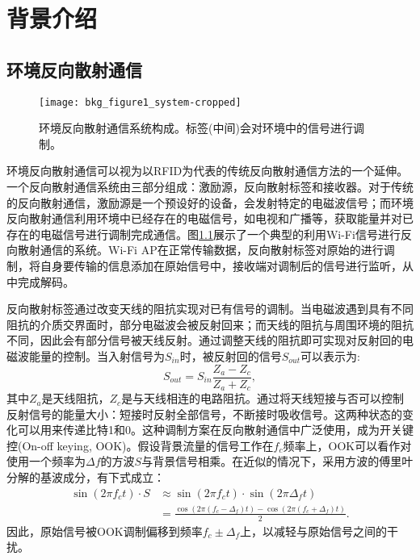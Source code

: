 \chapter{背景介绍}
\label{chap:background}
\section{环境反向散射通信}
\begin{figure}
	\centering
	\texttt{[image: bkg\_figure1\_system-cropped]}
	\caption{环境反向散射通信系统构成。标签(中间)会对环境中的信号进行调制。}
	\label{fig:system}
\end{figure}
环境反向散射通信可以视为以RFID为代表的传统反向散射通信方法的一个延伸。一个反向散射通信系统由三部分组成：激励源，反向散射标签和接收器。对于传统的反向散射通信，激励源是一个预设好的设备，会发射特定的电磁波信号；而环境反向散射通信利用环境中已经存在的电磁信号，如电视和广播等，获取能量并对已存在的电磁信号进行调制完成通信。图\ref{fig:system}展示了一个典型的利用Wi-Fi信号进行反向散射通信的系统。Wi-Fi AP在正常传输数据，反向散射标签对原始的进行调制，将自身要传输的信息添加在原始信号中，接收端对调制后的信号进行监听，从中完成解码。

反向散射标签通过改变天线的阻抗实现对已有信号的调制。当电磁波遇到具有不同阻抗的介质交界面时，部分电磁波会被反射回来；而天线的阻抗与周围环境的阻抗不同，因此会有部分信号被天线反射。通过调整天线的阻抗即可实现对反射回的电磁波能量的控制。当入射信号为$S_{in}$时，被反射回的信号$S_{out}$可以表示为:
\begin{equation}
S_{out} = S_{in} \frac{Z_a - Z_c}{Z_a + Z_c},
\end{equation}
其中$Z_a$是天线阻抗，$Z_c$是与天线相连的电路阻抗。通过将天线短接与否可以控制反射信号的能量大小：短接时反射全部信号，不断接时吸收信号。这两种状态的变化可以用来传递比特1和0。这种调制方案在反向散射通信中广泛使用，成为开关键控(On-off keying, OOK)。假设背景流量的信号工作在$f_c$频率上，OOK可以看作对使用一个频率为$\Delta f$的方波$S$与背景信号相乘。在近似的情况下，采用方波的傅里叶分解的基波成分，有下式成立：
\begin{equation}
\begin{split}
	\sin(2\pi f_c t)\cdot S &\approx \sin(2\pi f_c t)\cdot \sin(2\pi \Delta_f t)\\
	& =\frac{\cos (2\pi (f_c - \Delta_f)t) - \cos (2\pi (f_c + \Delta_f)t)}{2}.
\end{split}
\end{equation}
因此，原始信号被OOK调制偏移到频率$f_c \pm \Delta_f$上，以减轻与原始信号之间的干扰。

